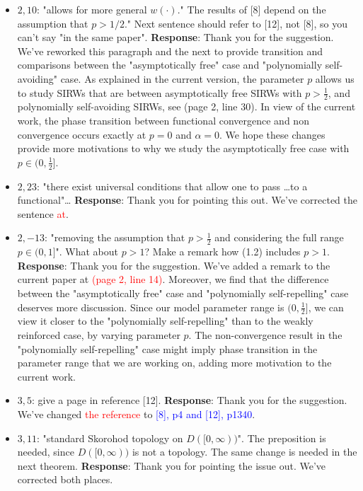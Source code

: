 \documentclass[11pt,a4paper]{article}
\numberwithin{equation}{section}
\newcommand{\corr}[2]{We've changed {\textcolor{red}{#1}} to {\textcolor{blue}{#2}}.}
\def\TBF#1{\textcolor{red}{#1}} %
\begin{document}
\begin{itemize}
		\item 
		$2,10$: "allows for more general $w(\cdot)$." The results of [8] depend on the assumption that $p > 1/2.$" Next sentence should refer to [12], not [8], so you can't say "in the same paper".
		\subitem \textbf{Response}: Thank you for the suggestion. We've reworked this paragraph and the next to provide transition and comparisons between the "asymptotically free" case and "polynomially self-avoiding" case. As explained in the current version, the parameter $p$ allows us to study SIRWs that are between asymptotically free SIRWs with $p>\frac{1}{2}$, and polynomially self-avoiding SIRWs, see (page 2, line 30). In view of the current work, the phase transition between functional convergence and non convergence occurs exactly at $p=0$ and $\alpha =0$. We hope these changes provide more motivations to why we study the asymptotically free case with $p\in(0,\frac{1}{2}]$.
		
		
		\item
		$2,23$: "there exist universal conditions that allow one to pass \dots to a functional"\dots
		\subitem \textbf{Response}: Thank you for pointing this out. We've corrected the sentence \TBF{at}. 
		
		\item
		$2,-13$: "removing the assumption that $p > \frac{1}{2}$ and considering the full range $p\in (0,1]$". What about $p > 1$? Make a remark how (1.2) includes $p > 1$.
		\subitem \textbf{Response}: Thank you for the suggestion. We've added a remark to the current paper at \TBF{(page 2, line 14)}. Moreover, we find that the difference between the "asymptotically free" case and "polynomially self-repelling" case deserves more discussion. Since our model parameter range is $(0,\frac{1}{2}]$, we can view it closer to the "polynomially self-repelling" than to the weakly reinforced case, by varying parameter $p$. The non-convergence result in the "polynomially self-repelling" case might imply phase transition in the parameter range that we are working on, adding more motivation to the current work.
		
		
		\item
		$3,5$: give a page in reference [12].
		\subitem \textbf{Response}: Thank you for the suggestion. \corr{the reference }{[8], p4 and [12],
			p1340}
		
		
		\item 
		$3,11$: "standard Skorohod topology on $D([0,\infty))$". The preposition is needed, since $D([0,\infty))$ is not a topology. The same change is needed in the next theorem.
		\subitem \textbf{Response}: Thank you for pointing the issue out. We've corrected both places.
		

\end{itemize}
\end{document}
